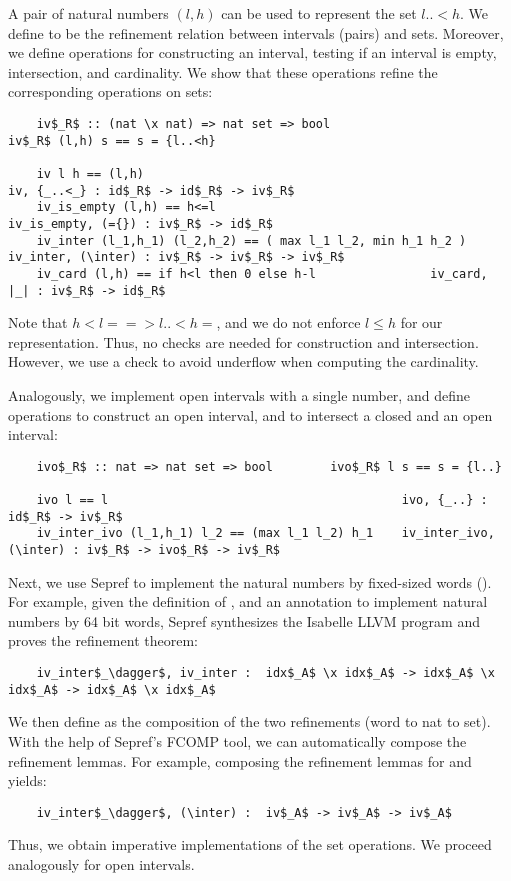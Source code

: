 \documentclass[sn-mathphys,Numbered]{sn-jnl}
\theoremstyle{thmstyleone}%
\theoremstyle{definition}%
\theoremstyle{thmstylethree}%
\begin{document}
  A pair of natural numbers \is$(l,h)$ can be used to represent the set \is${l..<h}$. We define  to be
  the refinement relation between intervals (pairs) and sets.
  Moreover, we define operations for constructing an interval, testing if an interval is empty, intersection, and cardinality.
  We show that these operations refine the corresponding operations on sets:
  \begin{lstlisting}
    iv$_R$ :: (nat \x nat) => nat set => bool                    iv$_R$ (l,h) s == s = {l..<h}

    iv l h == (l,h)                                                 iv, {_..<_} : id$_R$ -> id$_R$ -> iv$_R$
    iv_is_empty (l,h) == h<=l                                    iv_is_empty, (={}) : iv$_R$ -> id$_R$
    iv_inter (l_1,h_1) (l_2,h_2) == ( max l_1 l_2, min h_1 h_2 )     iv_inter, (\inter) : iv$_R$ -> iv$_R$ -> iv$_R$
    iv_card (l,h) == if h<l then 0 else h-l                iv_card, |_| : iv$_R$ -> id$_R$
  \end{lstlisting}
  Note that \is$h<l ==> {l..<h} = {}$, and we do not enforce $l\le h$ for our representation. Thus, no checks are needed for construction and intersection.
  However, we use a check to avoid underflow when computing the cardinality.

  Analogously, we implement open intervals with a single number, and define operations to construct an open interval,
  and to intersect a closed and an open interval:
  \begin{lstlisting}
    ivo$_R$ :: nat => nat set => bool        ivo$_R$ l s == s = {l..}

    ivo l == l                                         ivo, {_..} : id$_R$ -> iv$_R$
    iv_inter_ivo (l_1,h_1) l_2 == (max l_1 l_2) h_1    iv_inter_ivo, (\inter) : iv$_R$ -> ivo$_R$ -> iv$_R$
  \end{lstlisting}

  Next, we use Sepref to implement the natural numbers by fixed-sized words ().
  For example, given the definition of , and an annotation to implement natural numbers by 64 bit words,
  Sepref synthesizes the Isabelle LLVM program  and proves the refinement theorem:
  \begin{lstlisting}
    iv_inter$_\dagger$, iv_inter :  idx$_A$ \x idx$_A$ -> idx$_A$ \x idx$_A$ -> idx$_A$ \x idx$_A$
  \end{lstlisting}
  We then define  as the composition of the two refinements (word to nat to set).
  With the help of Sepref's FCOMP tool, we can automatically compose the refinement lemmas.
  For example, composing the refinement lemmas for  and  yields:
  \begin{lstlisting}
    iv_inter$_\dagger$, (\inter) :  iv$_A$ -> iv$_A$ -> iv$_A$
  \end{lstlisting}
  Thus, we obtain imperative implementations of the set operations. We proceed analogously for open intervals.
\end{document}
